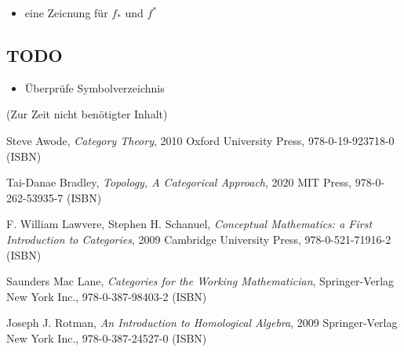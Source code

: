 \documentclass[a4paper]{amsart}
\theoremstyle{definition}
\begin{document}
\begin{itemize}
   \item eine Zeicnung für $f_*$ und $f^*$
\end{itemize}

\begin{backup}
\section{TODO}
\begin{itemize}
     \item Überprüfe Symbolverzeichnis
\end{itemize}

\end{backup}

\begin{backup}
    (Zur Zeit nicht benötigter Inhalt)
\end{backup}

\begin{thebibliography}{9}
      Steve Awode, \emph{Category Theory},
      2010 Oxford University Press, 978-0-19-923718-0 (ISBN)

      Tai-Danae Bradley, \emph{Topology, A Categorical Approach},
      2020 MIT Press, 978-0-262-53935-7 (ISBN)

      F. William Lawvere, Stephen H. Schanuel, \emph{Conceptual Mathematics: a First Introduction to Categories},
      2009 Cambridge University Press, 978-0-521-71916-2 (ISBN)

      Saunders Mac Lane, \emph{Categories for the Working Mathematician},
      Springer-Verlag New York Inc., 978-0-387-98403-2 (ISBN)

   	Joseph J. Rotman, \emph{An Introduction to Homological Algebra},
   	2009 Springer-Verlag New York Inc., 978-0-387-24527-0 (ISBN)

\end{thebibliography}
\end{document}
